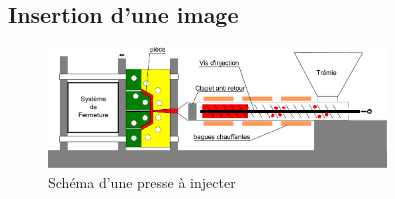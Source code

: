 \documentclass[b,e,cours]{D:/hubiC/GitHub/test_Baggio/paquets/classe_kara}
\begin{document}
\subsection{Insertion d'une image}
\begin{frame}
	\begin{figure}[h]
		\begin{center}
			\includegraphics[width=0.8\textwidth]{img/schema_presse_a_injecter.pdf} 
			\caption{Schéma d'une presse à injecter}
			\label{schema_presse_a_injecter}
		\end{center}
	\end{figure}
\end{frame}
\end{document}
